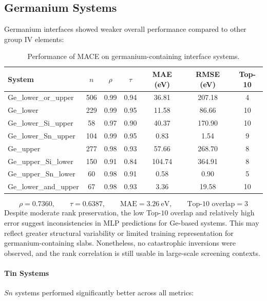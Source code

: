 \newpage \subsection*{Germanium Systems}

Germanium interfaces showed weaker overall performance compared to other group IV elements:

\begin{table}[H]
\centering
\begin{tabular}{lcccccc}
\toprule
               System &  $n$ &  $\rho$ &  $\tau$ &  MAE (eV) &  RMSE (eV) &  Top-10 \\
\midrule
 Ge\_lower\_or\_upper &  506 &    0.99 &    0.94 &     36.81 &     207.18 &       4 \\
            Ge\_lower &  229 &    0.99 &    0.95 &     11.58 &      86.66 &      10 \\
 Ge\_lower\_Si\_upper &   58 &    0.97 &    0.90 &     40.37 &     170.90 &      10 \\
 Ge\_lower\_Sn\_upper &  104 &    0.99 &    0.95 &      0.83 &       1.54 &       9 \\
            Ge\_upper &  277 &    0.98 &    0.93 &     57.66 &     268.70 &       8 \\
 Ge\_upper\_Si\_lower &  150 &    0.91 &    0.84 &    104.74 &     364.91 &       8 \\
 Ge\_upper\_Sn\_lower &   60 &    0.98 &    0.91 &      0.58 &       0.90 &       5 \\
Ge\_lower\_and\_upper &   67 &    0.98 &    0.93 &      3.36 &      19.58 &      10 \\
\bottomrule
\end{tabular}
\caption{Performance of MACE on germanium-containing interface systems.}
\label{tab:germanium_systems}
\end{table}

\begin{equation}
    \rho = 0.7360, \qquad \tau = 0.6387, \qquad \text{MAE} = 3.26~\text{eV}, \qquad \text{Top-10 overlap} = 3
\end{equation}
Despite moderate rank preservation, the low Top-$10$ overlap and relatively high error suggest inconsistencies in MLP predictions for Ge-based systems.
This may reflect greater structural variability or limited training representation for germanium-containing slabs.
Nonetheless, no catastrophic inversions were observed, and the rank correlation is still usable in large-scale screening contexts.

\newpage \paragraph{Tin Systems} $Sn$ systems performed significantly better across all metrics:

